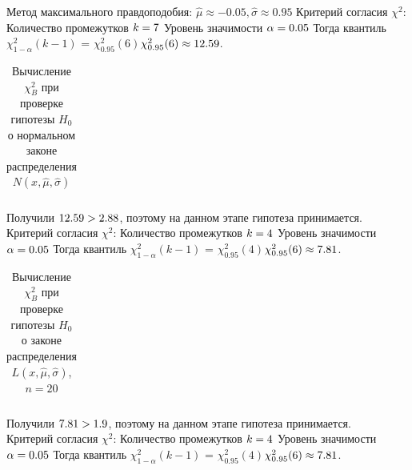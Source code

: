 \documentclass[a4paper]{article}
\begin{document}
\noindent Метод максимального правдоподобия:
\newline
$\hat{\mu} \approx -0.05, \hat{\sigma} \approx 0.95$
\newline
Критерий согласия $\chi^{2}$:
\newline
Количество промежутков $k =7$
\newline
Уровень значимости $\alpha = 0.05$
\newline
Тогда квантиль $\chi^{2}_{1-\alpha}(k-1)$ = $\chi^{2}_{0.95}(6)$$
	\newline
	\chi^{2}_{0.95}(6) \approx \BigChi$.
		\begin{table}[H]
            \centering
            \begin{tabular}{| c | c | c | c | c | c | c |}
                \hline
                
            \end{tabular}
            \caption{ Вычисление $\chi^{2}_{B}$ при проверке гипотезы $H_{0}$ о нормальном законе распределения $N(x,\hat{\mu}, \hat{\sigma})$}
			\label{tab:real_ditrib}
        \end{table}

\noindent Получили $12.59 > 2.88$, поэтому на данном этапе гипотеза принимается.
\\
	\newline
	\newline
	Критерий согласия $\chi^{2}$:
\newline
Количество промежутков $k =4$
\newline
Уровень значимости $\alpha = 0.05$
\newline
Тогда квантиль $\chi^{2}_{1-\alpha}(k-1)$ = $\chi^{2}_{0.95}(4)$$
	\newline
	\chi^{2}_{0.95}(6) \approx \SmallChi$.
\begin{table}[H]
	\centering
	\begin{tabular}{| c | c | c | c | c | c | c |}
		\hline
		
	\end{tabular}
	\caption{ Вычисление $\chi^{2}_{B}$ при проверке гипотезы $H_{0}$ о законе распределения $L(x,\hat{\mu}, \hat{\sigma})$, $n=20$}
	\label{tab:laplace_chi}
\end{table}

\noindent Получили $7.81 > 1.9$, поэтому на данном этапе гипотеза принимается.
\\
	\newline
	\newline
	Критерий согласия $\chi^{2}$:
\newline
Количество промежутков $k =4$
\newline
Уровень значимости $\alpha = 0.05$
\newline
Тогда квантиль $\chi^{2}_{1-\alpha}(k-1)$ = $\chi^{2}_{0.95}(4)$$
	\newline
	\chi^{2}_{0.95}(6) \approx \SmallChi$.
\end{document}
